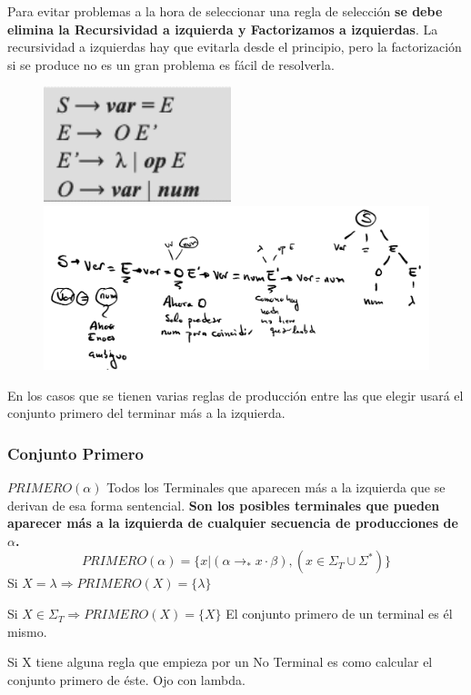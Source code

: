 \documentclass[12pt]{report} %
\begin{document}
Para evitar problemas a la hora de seleccionar una regla de selección
\textbf{se debe elimina la Recursividad a izquierda y Factorizamos a
izquierdas}. La recursividad a izquierdas hay que evitarla desde el
principio, pero la factorización si se produce no es un gran problema es
fácil de resolverla.

\begin{figure}[H]
	{\includegraphics[scale=.4]{image-20210312125711682.png}
	\includegraphics[scale=.2]{image-20210312125654582.png}}
\end{figure}

En los casos que se tienen varias reglas de producción entre las que
elegir usará el conjunto primero del terminar más a la izquierda.


\subsubsection{Conjunto Primero}

\(PRIMERO(\alpha)\) Todos los Terminales que aparecen más a la izquierda
que se derivan de esa forma sentencial. \textbf{Son los posibles
terminales que pueden aparecer más a la izquierda de cualquier secuencia
de producciones de \(\alpha\).} \[
PRIMERO(\alpha)=\{ x | (\alpha \rightarrow _* x \cdot \beta), (x \in \Sigma_T \cup \Sigma^*) \}
\] Si \(X=\lambda \Rightarrow PRIMERO(X)=\{\lambda\}\)

Si \(X \in \Sigma_T \Rightarrow PRIMERO(X)=\{X\}\) El conjunto primero
de un terminal es él mismo.

Si X tiene alguna regla que empieza por un No Terminal es como calcular
el conjunto primero de éste. Ojo con lambda.
\end{document}
